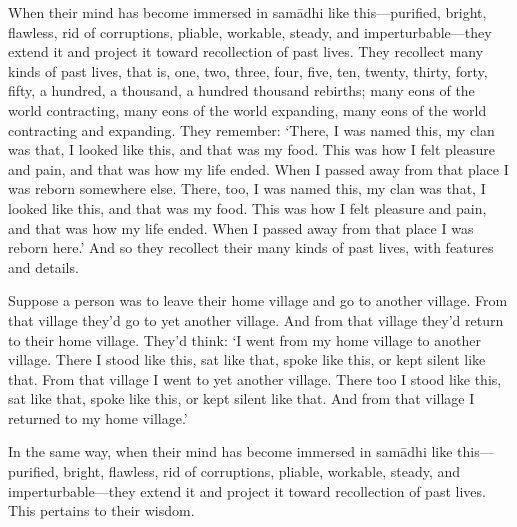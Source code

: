 \documentclass[12pt,openany]{book}%
\begin{document}
When their mind has become immersed in \textsanskrit{samādhi} like this—purified, bright, flawless, rid of corruptions, pliable, workable, steady, and imperturbable—they extend it and project it toward recollection of past lives. They recollect many kinds of past lives, that is, one, two, three, four, five, ten, twenty, thirty, forty, fifty, a hundred, a thousand, a hundred thousand rebirths; many eons of the world contracting, many eons of the world expanding, many eons of the world contracting and expanding. They remember: ‘There, I was named this, my clan was that, I looked like this, and that was my food. This was how I felt pleasure and pain, and that was how my life ended. When I passed away from that place I was reborn somewhere else. There, too, I was named this, my clan was that, I looked like this, and that was my food. This was how I felt pleasure and pain, and that was how my life ended. When I passed away from that place I was reborn here.’ And so they recollect their many kinds of past lives, with features and details. 

Suppose a person was to leave their home village and go to another village. From that village they’d go to yet another village. And from that village they’d return to their home village. They’d think: ‘I went from my home village to another village. There I stood like this, sat like that, spoke like this, or kept silent like that. From that village I went to yet another village. There too I stood like this, sat like that, spoke like this, or kept silent like that. And from that village I returned to my home village.’ 

In the same way, when their mind has become immersed in \textsanskrit{samādhi} like this—purified, bright, flawless, rid of corruptions, pliable, workable, steady, and imperturbable—they extend it and project it toward recollection of past lives. This pertains to their wisdom. 
\end{document}
